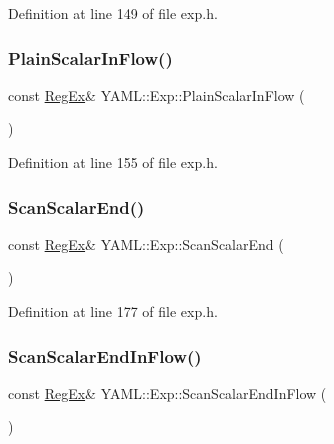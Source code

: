 Definition at line 149 of file exp.\+h.

\mbox{\label{namespace_y_a_m_l_1_1_exp_af5cf91fb6ffbc3274d373ea24882e0f5}} 
\subsubsection{\texorpdfstring{PlainScalarInFlow()}{PlainScalarInFlow()}}
{\footnotesize\ttfamily const \mbox{\hyperlink{class_y_a_m_l_1_1_reg_ex}{Reg\+Ex}}\& Y\+A\+M\+L\+::\+Exp\+::\+Plain\+Scalar\+In\+Flow (\begin{DoxyParamCaption}{ }\end{DoxyParamCaption})\hspace{0.3cm}{\ttfamily [inline]}}



Definition at line 155 of file exp.\+h.

\mbox{\label{namespace_y_a_m_l_1_1_exp_ae66ae8d486fd7ccbbc1aa67b067f2412}} 
\subsubsection{\texorpdfstring{ScanScalarEnd()}{ScanScalarEnd()}}
{\footnotesize\ttfamily const \mbox{\hyperlink{class_y_a_m_l_1_1_reg_ex}{Reg\+Ex}}\& Y\+A\+M\+L\+::\+Exp\+::\+Scan\+Scalar\+End (\begin{DoxyParamCaption}{ }\end{DoxyParamCaption})\hspace{0.3cm}{\ttfamily [inline]}}



Definition at line 177 of file exp.\+h.

\mbox{\label{namespace_y_a_m_l_1_1_exp_ae696c151140fd5d3b0fd16a69133d8db}} 
\subsubsection{\texorpdfstring{ScanScalarEndInFlow()}{ScanScalarEndInFlow()}}
{\footnotesize\ttfamily const \mbox{\hyperlink{class_y_a_m_l_1_1_reg_ex}{Reg\+Ex}}\& Y\+A\+M\+L\+::\+Exp\+::\+Scan\+Scalar\+End\+In\+Flow (\begin{DoxyParamCaption}{ }\end{DoxyParamCaption})\hspace{0.3cm}{\ttfamily [inline]}}



